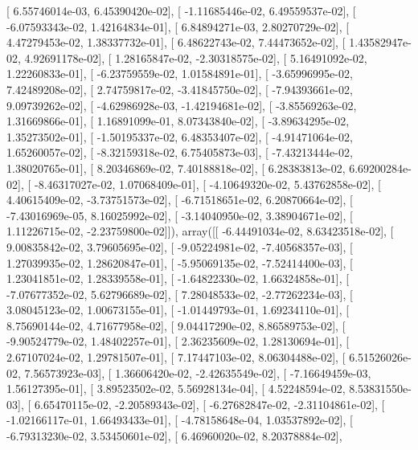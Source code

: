 \documentclass{article}
\begin{document}
       [  6.55746014e-03,   6.45390420e-02],
       [ -1.11685446e-02,   6.49559537e-02],
       [ -6.07593343e-02,   1.42164834e-01],
       [  6.84894271e-03,   2.80270729e-02],
       [  4.47279453e-02,   1.38337732e-01],
       [  6.48622743e-02,   7.44473652e-02],
       [  1.43582947e-02,   4.92691178e-02],
       [  1.28165847e-02,  -2.30318575e-02],
       [  5.16491092e-02,   1.22260833e-01],
       [ -6.23759559e-02,   1.01584891e-01],
       [ -3.65996995e-02,   7.42489208e-02],
       [  2.74759817e-02,  -3.41845750e-02],
       [ -7.94393661e-02,   9.09739262e-02],
       [ -4.62986928e-03,  -1.42194681e-02],
       [ -3.85569263e-02,   1.31669866e-01],
       [  1.16891099e-01,   8.07343840e-02],
       [ -3.89634295e-02,   1.35273502e-01],
       [ -1.50195337e-02,   6.48353407e-02],
       [ -4.91471064e-02,   1.65260057e-02],
       [ -8.32159318e-02,   6.75405873e-03],
       [ -7.43213444e-02,   1.38020765e-01],
       [  8.20346869e-02,   7.40188818e-02],
       [  6.28383813e-02,   6.69200284e-02],
       [ -8.46317027e-02,   1.07068409e-01],
       [ -4.10649320e-02,   5.43762858e-02],
       [  4.40615409e-02,  -3.73751573e-02],
       [ -6.71518651e-02,   6.20870664e-02],
       [ -7.43016969e-05,   8.16025992e-02],
       [ -3.14040950e-02,   3.38904671e-02],
       [  1.11226715e-02,  -2.23759800e-02]]), array([[ -6.44491034e-02,   8.63423518e-02],
       [  9.00835842e-02,   3.79605695e-02],
       [ -9.05224981e-02,  -7.40568357e-03],
       [  1.27039935e-02,   1.28620847e-01],
       [ -5.95069135e-02,  -7.52414400e-03],
       [  1.23041851e-02,   1.28339558e-01],
       [ -1.64822330e-02,   1.66324858e-01],
       [ -7.07677352e-02,   5.62796689e-02],
       [  7.28048533e-02,  -2.77262234e-03],
       [  3.08045123e-02,   1.00673155e-01],
       [ -1.01449793e-01,   1.69234110e-01],
       [  8.75690144e-02,   4.71677958e-02],
       [  9.04417290e-02,   8.86589753e-02],
       [ -9.90524779e-02,   1.48402257e-01],
       [  2.36235609e-02,   1.28130694e-01],
       [  2.67107024e-02,   1.29781507e-01],
       [  7.17447103e-02,   8.06304488e-02],
       [  6.51526026e-02,   7.56573923e-03],
       [  1.36606420e-02,  -2.42635549e-02],
       [ -7.16649459e-03,   1.56127395e-01],
       [  3.89523502e-02,   5.56928134e-04],
       [  4.52248594e-02,   8.53831550e-03],
       [  6.65470115e-02,  -2.20589343e-02],
       [ -6.27682847e-02,  -2.31104861e-02],
       [ -1.02166117e-01,   1.66493433e-01],
       [ -4.78158648e-04,   1.03537892e-02],
       [ -6.79313230e-02,   3.53450601e-02],
       [  6.46960020e-02,   8.20378884e-02],
\end{document}
